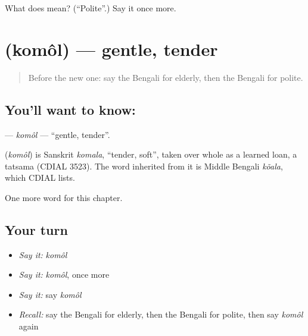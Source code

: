 \begin{tcolorbox}[breakable,colback=teal!4,colframe=teal!35!black,title={Before you move on}]
What does  mean? (\textquotedblleft{}Polite\textquotedblright{}.) Say it once more.
\end{tcolorbox}
\section[\texorpdfstring{\bn{কোমল} (komôl)}{কোমল (komôl)}]{ (komôl) — gentle, tender}

\label{lesson:BN-C161-komol}



\begin{quote}
Before the new one: say the Bengali for elderly, then the Bengali for polite.
\end{quote}

\subsection*{You'll want to know: }
\textbf{} — \emph{komôl} — \textquotedblleft{}gentle, tender\textquotedblright{}.

\begin{cousinweb}
\textbf{} (\emph{komôl}) is Sanskrit \emph{komala}, \textquotedblleft{}tender, soft\textquotedblright{}, taken over whole as a learned loan, a tatsama (CDIAL 3523). The word inherited from it is Middle Bengali \emph{kõala}, which CDIAL lists.
\end{cousinweb}

\begin{grammarlens}[title={What you've built}]
One more word for this chapter.
\end{grammarlens}

\subsection*{Your turn}
\begin{itemize}
\raggedright
  \item \emph{Say it:} \emph{komôl}
  \item \emph{Say it:} \emph{komôl}, once more
  \item \emph{Say it:} say \emph{komôl}
  \item \emph{Recall:} say the Bengali for elderly, then the Bengali for polite, then say \emph{komôl} again
\end{itemize}

